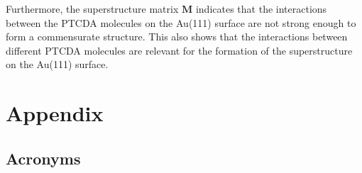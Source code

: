 \documentclass[fontsize=11pt,reqno,a4paper,oneside]{scrartcl}
\begin{document}
Furthermore, the superstructure matrix $\mathbf{M}$ indicates that the interactions between the \ac{PTCDA} molecules on the Au(111) surface are not strong enough to form a commensurate structure. This also shows that the interactions between different \ac{PTCDA} molecules are relevant for the formation of the superstructure on the Au(111) surface.


\clearpage
\section{Appendix}

\subsection*{Acronyms}

\begin{acronym}
\end{acronym}

\printbibliography[heading=bibintoc, title={References}] 
\end{document}
